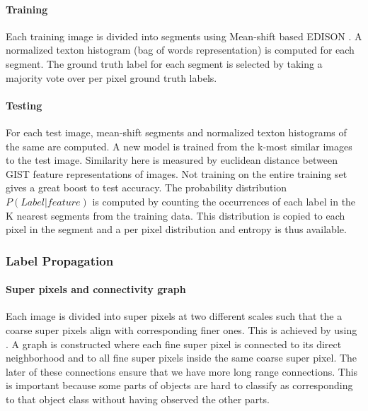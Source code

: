 \documentclass{article} %
\begin{document}
\paragraph{Training} Each training image is divided into segments using
Mean-shift based EDISON \cite{meanshift}.
A normalized texton histogram (bag of words representation) is computed for each segment.
The ground truth label for each segment is selected by taking a majority vote over per pixel ground truth labels.

\paragraph{Testing} For each test image, mean-shift segments and normalized texton histograms of the same are computed.
A new model is trained from the k-most similar images to the test image. Similarity here is measured by euclidean distance between GIST\cite{GIST} feature representations of images. Not training on the entire training set gives a great boost to test accuracy.
The probability distribution $P(Label | feature)$ is computed by counting the occurrences of each label in the K nearest segments from the training data.
This distribution is copied to each pixel in the segment and a per pixel distribution and entropy is thus available.

\subsubsection{Label Propagation}
\paragraph{Super pixels and connectivity graph}
\label{sec:labprop}
Each image is divided into super pixels at two different scales such that
the a coarse super pixels align with corresponding finer ones.
This is achieved by using \cite{}.%
A graph is constructed where each fine super pixel is connected to its
direct neighborhood and to all fine super pixels inside the same
coarse super pixel.
The later of these connections ensure that we have more long range connections. This is important because some parts of objects are hard to classify as corresponding to that object class without having observed the other parts.
\end{document}

